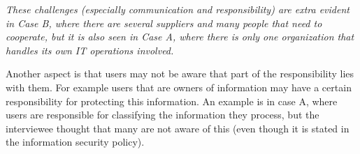 \textit{These challenges (especially communication and responsibility) are extra evident in Case B, where there are several suppliers and many people that need to cooperate, but it is also seen in Case A, where there is only one organization that handles its own IT operations involved.}

Another aspect is that users may not be aware that part of the responsibility lies with them. For example users that are owners of information may have a certain responsibility for protecting this information. An example is in case A, where users are responsible for classifying the information they process, but the interviewee thought that many are not aware of this (even though it is stated in the information security policy).

